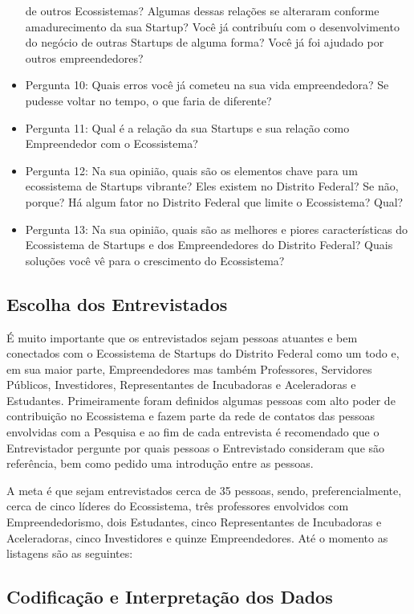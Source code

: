 \begin{itemize}
  de outros Ecossistemas? Algumas dessas relações se alteraram conforme amadurecimento da sua Startup? Você já contribuíu com o desenvolvimento do negócio de outras Startups de alguma forma? Você
  já foi ajudado por outros empreendedores?
  \item Pergunta 10: Quais erros você já cometeu na sua vida empreendedora? Se pudesse voltar no tempo, o que faria de diferente?
  \item Pergunta 11: Qual é a relação da sua Startups e sua relação como Empreendedor com o Ecossistema?
  \item Pergunta 12: Na sua opinião, quais são os elementos chave para um ecossistema de Startups vibrante? Eles existem no Distrito Federal? Se não, porque? Há algum fator no Distrito Federal que
  limite o Ecossistema? Qual?
  \item Pergunta 13: Na sua opinião, quais são as melhores e piores características do Ecossistema de Startups e dos Empreendedores do Distrito Federal? Quais soluções você vê para o crescimento do
  Ecossistema?
\end{itemize}

\subsection{Escolha dos Entrevistados}
\label{subsection:escolha_dos_entrevistados}

É muito importante que os entrevistados sejam pessoas atuantes e bem conectados com o Ecossistema de Startups do Distrito Federal como um todo e, em sua maior parte, Empreendedores mas também
Professores, Servidores Públicos, Investidores, Representantes de Incubadoras e Aceleradoras e Estudantes. Primeiramente foram definidos algumas pessoas com alto poder de contribuição no Ecossistema
e fazem parte da rede de contatos das pessoas envolvidas com a Pesquisa e ao fim de cada entrevista é recomendado que o Entrevistador pergunte por quais pessoas o Entrevistado consideram que são
referência, bem como pedido uma introdução entre as pessoas.

A meta é que sejam entrevistados cerca de 35 pessoas, sendo, preferencialmente, cerca de cinco líderes do Ecossistema, três professores envolvidos com Empreendedorismo,
dois Estudantes, cinco Representantes de Incubadoras e Aceleradoras, cinco Investidores e quinze Empreendedores. Até o momento as listagens são as seguintes:

\subsection{Codificação e Interpretação dos Dados}
\label{subsection:codificacao_e_interpretacao_dos_dados}

